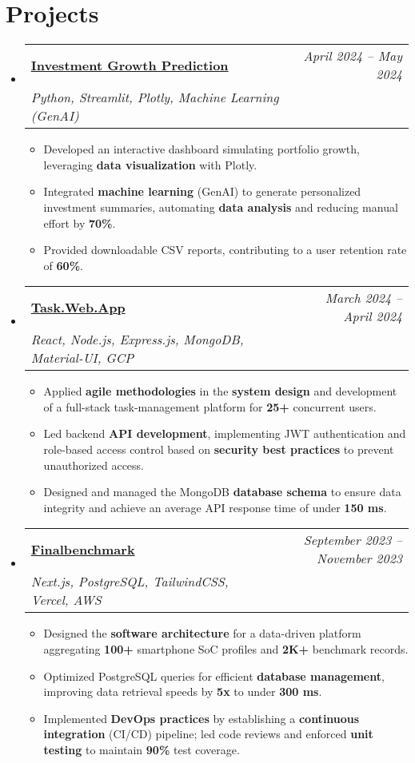 \documentclass[letterpaper,11pt]{article}
\makeatletter
\newcommand{\resumeItem}[1]{
  \item\small{#1 \vspace{-2pt}}
}
\newcommand{\resumeSubheading}[4]{
  \vspace{-2pt}\item
  \begin{tabular*}{0.97\textwidth}[t]{l@{\extracolsep{\fill}}r}
    \textbf{#1} & \textit{\small #2} \\
    \textit{\small #3} & \textit{\small #4} \\
  \end{tabular*}\vspace{-7pt}
}
\newcommand{\resumeSubHeadingListStart}{\begin{itemize}[leftmargin=0.15in, label={}]}
\newcommand{\resumeSubHeadingListEnd}{\end{itemize}}
\newcommand{\resumeItemListStart}{\begin{itemize}}
\newcommand{\resumeItemListEnd}{\end{itemize}\vspace{-5pt}}
\makeatother
\begin{document}
\section{Projects}
\resumeSubHeadingListStart
    \resumeSubheading{\href{https://aiwrapper.streamlit.app/}{\textbf{Investment Growth Prediction}}}{April 2024 -- May 2024}
    {\emph{Python, Streamlit, Plotly, Machine Learning (GenAI)}}{ }
  \resumeItemListStart
    \resumeItem{Developed an interactive dashboard simulating portfolio growth, leveraging \textbf{data visualization} with Plotly.}
    \resumeItem{Integrated \textbf{machine learning} (GenAI) to generate personalized investment summaries, automating \textbf{data analysis} and reducing manual effort by \textbf{70\%}.}
    \resumeItem{Provided downloadable CSV reports, contributing to a user retention rate of \textbf{60\%}.}
  \resumeItemListEnd

  \resumeSubheading{\href{https://github.com/abhay-byte/task_management_tool}{\textbf{Task.Web.App}}}{March 2024 -- April 2024}
  {\emph{React, Node.js, Express.js, MongoDB, Material-UI, GCP}}{}
  \resumeItemListStart
    \resumeItem{Applied \textbf{agile methodologies} in the \textbf{system design} and development of a full-stack task-management platform for \textbf{25+} concurrent users.}
    \resumeItem{Led backend \textbf{API development}, implementing JWT authentication and role-based access control based on \textbf{security best practices} to prevent unauthorized access.}
    \resumeItem{Designed and managed the MongoDB \textbf{database schema} to ensure data integrity and achieve an average API response time of under \textbf{150 ms}.}
  \resumeItemListEnd

  \resumeSubheading{\href{https://github.com/abhay-byte/fb_nextjs}{\textbf{Finalbenchmark}}}{September 2023 -- November 2023}
  {\emph{Next.js, PostgreSQL, TailwindCSS, Vercel, AWS}}{}
  \resumeItemListStart
    \resumeItem{Designed the \textbf{software architecture} for a data-driven platform aggregating \textbf{100+} smartphone SoC profiles and \textbf{2K+} benchmark records.}
    \resumeItem{Optimized PostgreSQL queries for efficient \textbf{database management}, improving data retrieval speeds by \textbf{5x} to under \textbf{300 ms}.}
    \resumeItem{Implemented \textbf{DevOps practices} by establishing a \textbf{continuous integration} (CI/CD) pipeline; led code reviews and enforced \textbf{unit testing} to maintain \textbf{90\%} test coverage.}
  \resumeItemListEnd
\resumeSubHeadingListEnd
\end{document}

